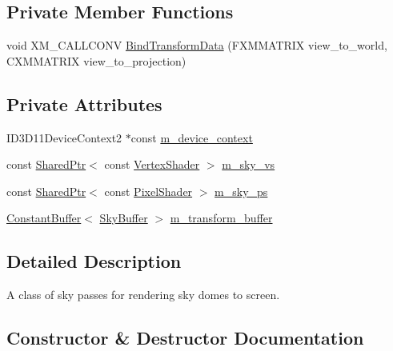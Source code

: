 \subsection*{Private Member Functions}
\begin{DoxyCompactItemize}
\item 
void X\+M\+\_\+\+C\+A\+L\+L\+C\+O\+NV \hyperlink{classmage_1_1_sky_pass_a6df5be2de9df87db05ca1fba06169c4c}{Bind\+Transform\+Data} (F\+X\+M\+M\+A\+T\+R\+IX view\+\_\+to\+\_\+world, C\+X\+M\+M\+A\+T\+R\+IX view\+\_\+to\+\_\+projection)
\end{DoxyCompactItemize}
\subsection*{Private Attributes}
\begin{DoxyCompactItemize}
\item 
I\+D3\+D11\+Device\+Context2 $\ast$const \hyperlink{classmage_1_1_sky_pass_aa553e4b7c269d5b639a14395186bf7c7}{m\+\_\+device\+\_\+context}
\item 
const \hyperlink{namespacemage_a1e01ae66713838a7a67d30e44c67703e}{Shared\+Ptr}$<$ const \hyperlink{classmage_1_1_vertex_shader}{Vertex\+Shader} $>$ \hyperlink{classmage_1_1_sky_pass_a406ffced453d34b583a7bf975cf7f70f}{m\+\_\+sky\+\_\+vs}
\item 
const \hyperlink{namespacemage_a1e01ae66713838a7a67d30e44c67703e}{Shared\+Ptr}$<$ const \hyperlink{namespacemage_a27ecaf266420ee7a494d64edc0757129}{Pixel\+Shader} $>$ \hyperlink{classmage_1_1_sky_pass_abe9548ff1e4b3c15ac9004e4ba4ca052}{m\+\_\+sky\+\_\+ps}
\item 
\hyperlink{structmage_1_1_constant_buffer}{Constant\+Buffer}$<$ \hyperlink{structmage_1_1_sky_buffer}{Sky\+Buffer} $>$ \hyperlink{classmage_1_1_sky_pass_afa5e9294b59414d37ea97b42cfadd041}{m\+\_\+transform\+\_\+buffer}
\end{DoxyCompactItemize}


\subsection{Detailed Description}
A class of sky passes for rendering sky domes to screen. 

\subsection{Constructor \& Destructor Documentation}
\hypertarget{classmage_1_1_sky_pass_a41bb9d2d37f2c3a7bc5b12cffad9dafa}{}\label{classmage_1_1_sky_pass_a41bb9d2d37f2c3a7bc5b12cffad9dafa} 
